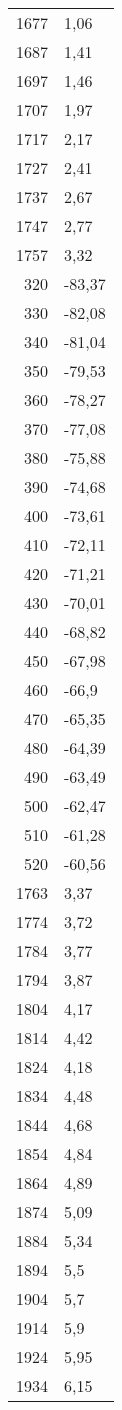 \begin{table}
\begin{tabular}{rl}
1677	&	1,06\\
1687	&	1,41\\
1697	&	1,46\\
1707	&	1,97\\
1717	&	2,17\\
1727	&	2,41\\
1737	&	2,67\\
1747	&	2,77\\
1757	&	3,32\\
320	&	-83,37\\
330	&	-82,08\\
340	&	-81,04\\
350	&	-79,53\\
360	&	-78,27\\
370	&	-77,08\\
380	&	-75,88\\
390	&	-74,68\\
400	&	-73,61\\
410	&	-72,11\\
420	&	-71,21\\
430	&	-70,01\\
440	&	-68,82\\
450	&	-67,98\\
460	&	-66,9\\
470	&	-65,35\\
480	&	-64,39\\
490	&	-63,49\\
500	&	-62,47\\
510	&	-61,28\\
520	&	-60,56\\
1763	&	3,37\\
1774	&	3,72\\
1784	&	3,77\\
1794	&	3,87\\
1804	&	4,17\\
1814	&	4,42\\
1824	&	4,18\\
1834	&	4,48\\
1844	&	4,68\\
1854	&	4,84\\
1864	&	4,89\\
1874	&	5,09\\
1884	&	5,34\\
1894	&	5,5\\
1904	&	5,7\\
1914	&	5,9\\
1924	&	5,95\\
1934	&	6,15\\

\end{tabular}
\end{table}
